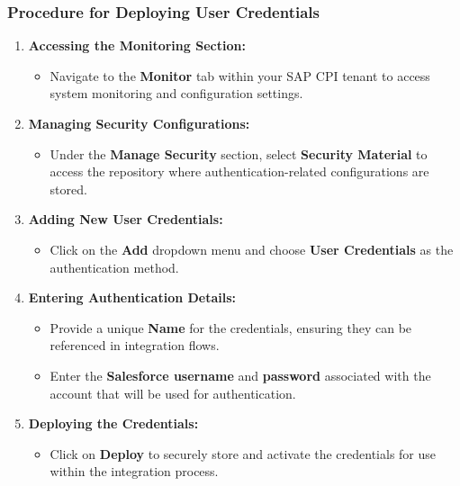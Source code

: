 \subsubsection{Procedure for Deploying User Credentials}

\begin{enumerate}
    \item \textbf{Accessing the Monitoring Section:}
    \begin{itemize}
        \item Navigate to the \textbf{Monitor} tab within your SAP CPI tenant to access system monitoring and configuration settings.
    \end{itemize}
    
    \item \textbf{Managing Security Configurations:}
    \begin{itemize}
        \item Under the \textbf{Manage Security} section, select \textbf{Security Material} to access the repository where authentication-related configurations are stored.
    \end{itemize}
    
    \item \textbf{Adding New User Credentials:}
    \begin{itemize}
        \item Click on the \textbf{Add} dropdown menu and choose \textbf{User Credentials} as the authentication method.
    \end{itemize}
    
    \item \textbf{Entering Authentication Details:}
    \begin{itemize}
        \item Provide a unique \textbf{Name} for the credentials, ensuring they can be referenced in integration flows.
        \item Enter the \textbf{Salesforce username} and \textbf{password} associated with the account that will be used for authentication.
    \end{itemize}
    
    \item \textbf{Deploying the Credentials:}
    \begin{itemize}
        \item Click on \textbf{Deploy} to securely store and activate the credentials for use within the integration process.
    \end{itemize}
\end{enumerate}

